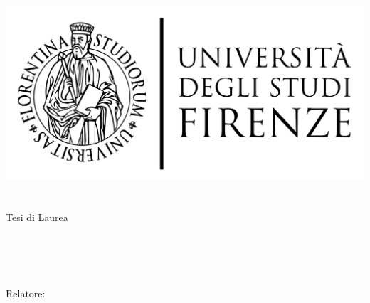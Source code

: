 \begin{titlepage}
    \begin{addmargin}[-1cm]{-3cm}
    \begin{center}
        \large
        \hfill
        \vfill

        \begingroup
            \includegraphics[scale=0.15]{logo/LOGO}\\
            \myFaculty \\
            \myDegree \\
            \vspace{0.5cm}
            \vspace{0.5cm}
            Tesi di Laurea        
        \endgroup
        
        \vfill
        \begingroup
            \color{Maroon}\spacedallcaps{\myTitle} \\ $\ $\\
            \spacedallcaps{\myEnglishTitle} \\
            \bigskip
        \endgroup

        \spacedlowsmallcaps{\myName}
        \vfill
        \vfill
        Relatore: \emph{\myProf}\\
        \vfill
        \vfill
        \myTime
        \vfill
    \end{center}
  \end{addmargin}
\end{titlepage}
